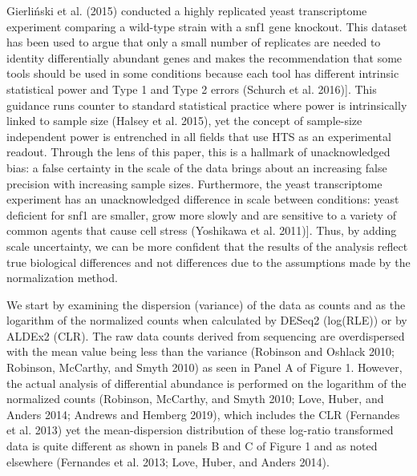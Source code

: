\documentclass[
]{article}
\begin{document}
Gierliński et al. (2015) conducted a highly replicated yeast
transcriptome experiment comparing a wild-type strain with a snf1 gene
knockout. This dataset has been used to argue that only a small number
of replicates are needed to identity differentially abundant genes and
makes the recommendation that some tools should be used in some
conditions because each tool has different intrinsic statistical power
and Type 1 and Type 2 errors (Schurch et al. 2016){]}. This guidance
runs counter to standard statistical practice where power is
intrinsically linked to sample size (Halsey et al. 2015), yet the
concept of sample-size independent power is entrenched in all fields
that use HTS as an experimental readout. Through the lens of this paper,
this is a hallmark of unacknowledged bias: a false certainty in the
scale of the data brings about an increasing false precision with
increasing sample sizes. Furthermore, the yeast transcriptome experiment
has an unacknowledged difference in scale between conditions: yeast
deficient for snf1 are smaller, grow more slowly and are sensitive to a
variety of common agents that cause cell stress (Yoshikawa et al.
2011){]}. Thus, by adding scale uncertainty, we can be more confident
that the results of the analysis reflect true biological differences and
not differences due to the assumptions made by the normalization method.

We start by examining the dispersion (variance) of the data as counts
and as the logarithm of the normalized counts when calculated by DESeq2
(log(RLE)) or by ALDEx2 (CLR). The raw data counts derived from
sequencing are overdispersed with the mean value being less than the
variance (Robinson and Oshlack 2010; Robinson, McCarthy, and Smyth 2010)
as seen in Panel A of Figure 1. However, the actual analysis of
differential abundance is performed on the logarithm of the normalized
counts (Robinson, McCarthy, and Smyth 2010; Love, Huber, and Anders
2014; Andrews and Hemberg 2019), which includes the CLR (Fernandes et
al. 2013) yet the mean-dispersion distribution of these log-ratio
transformed data is quite different as shown in panels B and C of Figure
1 and as noted elsewhere (Fernandes et al. 2013; Love, Huber, and Anders
2014).
\end{document}
